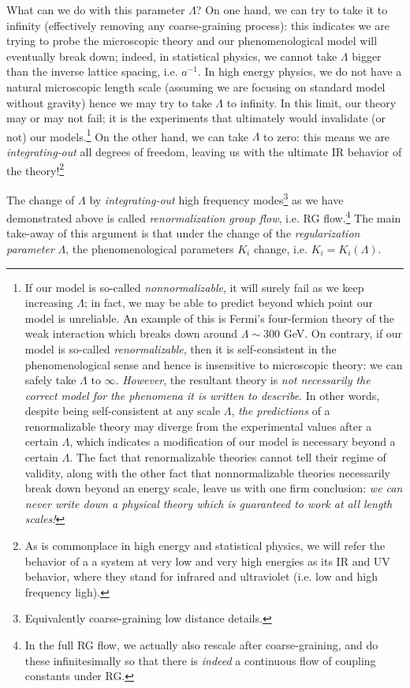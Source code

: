 What can we do with this parameter $\Lambda$? On one hand, we can try to take it to infinity (effectively removing any coarse-graining process): this indicates we are trying to probe the microscopic theory and our phenomenological model will eventually break down; indeed, in statistical physics, we cannot take $\Lambda$ bigger than the inverse lattice spacing, i.e. $a^{-1}$. In high energy physics, we do not have a natural microscopic length scale (assuming we are focusing on standard model without gravity) hence we may \naively try to take $\Lambda$ to infinity. In this limit, our theory may or may not fail; it is the experiments that ultimately would invalidate (or not) our models.\footnote{\label{footnote: normalizable vs nonnormalizable}
	If our model is so-called \emph{nonnormalizable}, it will surely fail as we keep increasing $\Lambda$; in fact, we may be able to predict beyond which point our model is unreliable. An example of this is Fermi's  four-fermion theory of the weak interaction which breaks down around $\Lambda\sim 300$ GeV. On contrary, if our model is so-called \emph{renormalizable}, then it is self-consistent in the phenomenological sense and hence is insensitive to microscopic theory: we can safely take $\Lambda$ to $\infty$. \emph{However}, the resultant theory is \emph{not necessarily the correct model for the phenomena it is written to describe}. In other words, despite being self-consistent at any scale $\Lambda$, \emph{the predictions} of a renormalizable theory may diverge from the experimental values after a certain $\Lambda$, which indicates a modification of our model is necessary beyond a certain $\Lambda$. The fact that renormalizable theories cannot tell their regime of validity, along with the other fact that nonnormalizable theories necessarily break down beyond an energy scale, leave us with one firm conclusion: \emph{we can never write down a physical theory which is guaranteed to work at all length scales!}
} On the other hand, we can take $\Lambda$ to zero: this means we are \emph{integrating-out} all degrees of freedom, leaving us with the ultimate IR behavior of the theory!\footnote{
	As is commonplace in high energy and statistical physics, we will refer the behavior of a a system at very low and very high energies as its IR and UV behavior, where they stand for infrared and ultraviolet (i.e. low and high frequency ligh).
}

The change of $\Lambda$ by \emph{integrating-out} high frequency modes\footnote{Equivalently coarse-graining low distance details.} as we have demonstrated above is called \emph{renormalization group flow}, i.e. RG flow.\footnote{In the full RG flow, we actually also rescale after coarse-graining, and do these infinitesimally so that there is \emph{indeed} a continuous flow of coupling constants under RG.} The main take-away of this argument is that under the change of the \emph{regularization parameter} $\Lambda$, the phenomenological parameters $K_i$ change, i.e. $K_i=K_i(\Lambda)$.

